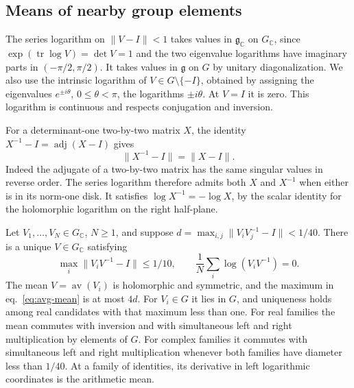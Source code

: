 \documentclass[11pt,letterpaper,reqno]{amsart}
\makeatletter
\numberwithin{equation}{section}
\renewcommand{\eqref}[1]{\textup{eq.~\ref{#1}}}
\theoremstyle{definition}
\newcommand{\ms@minorstart}{%
  \pushQED{\qed}\renewcommand{\qedsymbol}{$\blacksquare$}}
\newenvironment{lemma}[1][]{\ms@minorstart\ms@lemma[#1]}
  {\popQED\endms@lemma}
\theoremstyle{remark}
\makeatother
\begin{document}
\subsection{Means of nearby group elements}

The series logarithm on \(\|V-I\|<1\) takes values in
\(\mathfrak g_{\mathbb C}\) on \(G_{\mathbb C}\), since
\(\exp(\operatorname{tr}\log V)=\det V=1\) and the two eigenvalue
logarithms have imaginary parts in \((-\pi/2,\pi/2)\). It takes values
in \(\mathfrak g\) on \(G\) by unitary diagonalization. We also use the
intrinsic logarithm of \(V\in G\setminus\{-I\}\), obtained by assigning
the eigenvalues \(e^{\pm i\theta}\), \(0\leq\theta<\pi\), the
logarithms \(\pm i\theta\). At \(V=I\) it is zero. This logarithm is
continuous and respects conjugation and inversion.

For a determinant-one two-by-two matrix \(X\), the identity
\(X^{-1}-I=\operatorname{adj}(X-I)\) gives
\begin{equation}\label{eq:avg-inverse-defect}
 \|X^{-1}-I\|=\|X-I\|.
\end{equation}
Indeed the adjugate of a two-by-two matrix has the same singular
values in reverse order. The series logarithm therefore admits
both \(X\) and \(X^{-1}\) when either is in its norm-one disk.
It satisfies \(\log X^{-1}=-\log X\), by the scalar identity
for the holomorphic logarithm on the right half-plane.

\begin{lemma}[Local group mean]\label{lem:avg-mean}
Let \(V_1,\ldots,V_N\in G_{\mathbb C}\), \(N\geq1\), and suppose
\(d=\max_{i,j}\|V_iV_j^{-1}-I\|<1/40\). There is a unique
\(V\in G_{\mathbb C}\) satisfying
\begin{equation}
 \max_i\|V_iV^{-1}-I\|\leq 1/10,
 \qquad \frac1N\sum_i\log(V_iV^{-1})=0 .
 \label{eq:avg-mean}
\end{equation}
The mean \(V=\operatorname{av}(V_i)\) is holomorphic and symmetric,
and the maximum in \eqref{eq:avg-mean} is at most \(4d\). For
\(V_i\in G\) it lies in \(G\), and uniqueness holds among real
candidates with that maximum less than one. For real families the
mean commutes with inversion and with simultaneous left and right
multiplication by elements of \(G\). For complex families it commutes with simultaneous left and right
multiplication whenever both families have diameter less than \(1/40\). At a family of identities,
its derivative in left logarithmic coordinates is the arithmetic mean.
\end{lemma}
\end{document}
